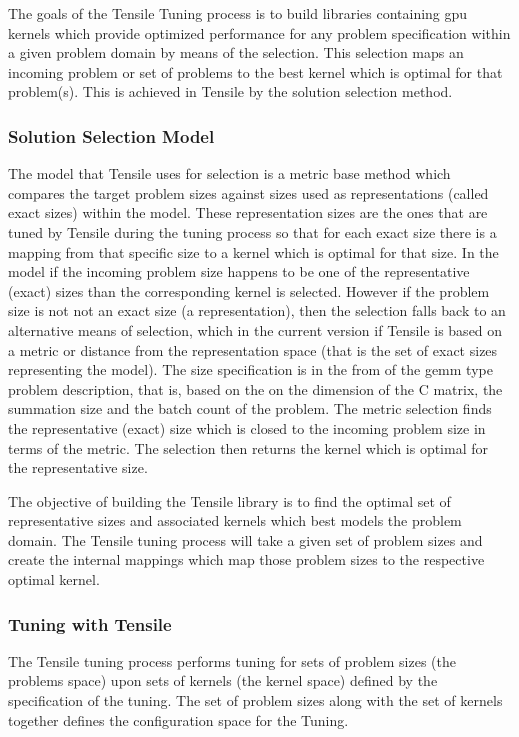\documentclass[]{article}
\begin{document}
The goals of the Tensile Tuning process is to build libraries containing gpu kernels which provide optimized performance for any problem specification within a given problem domain by means of the selection. This selection maps an incoming problem or set of problems to the best kernel which is optimal for that problem(s). This is achieved in Tensile by the solution selection method. 

\subsubsection{Solution Selection Model}

The model that Tensile uses for selection is a metric base method which compares the target problem sizes against sizes used as representations (called exact sizes) within the model. These representation sizes are the ones that are tuned by Tensile during the tuning process so that for each exact size there is a mapping from that specific size to a kernel which is optimal for that size. In the model if the incoming problem size happens to be one of the representative (exact) sizes than the corresponding kernel is selected. However if the problem size is not not an exact size (a representation), then the selection falls back to an alternative means of selection, which in the current version if Tensile is based on a metric or distance from the representation space (that is the set of exact sizes representing the model). The size specification is in the from of the gemm type problem description, that is, based on the on the dimension of the C matrix, the summation size and the batch count of the problem. The metric selection finds the representative (exact) size which is closed to the incoming problem size in terms of the metric. The selection then returns the kernel which is optimal for the representative size.

The objective of building the Tensile library is to find the optimal set of representative sizes and associated kernels which best models the problem domain. The Tensile tuning process will take a given set of problem sizes and create the internal mappings which map those problem sizes to the respective optimal kernel. 

\subsubsection{Tuning with Tensile}

The Tensile tuning process performs tuning for sets of problem sizes (the problems space) upon sets of kernels (the kernel space) defined by the specification of the tuning. The set of problem sizes along with the set of kernels together defines the configuration space for the Tuning.   
\end{document}
